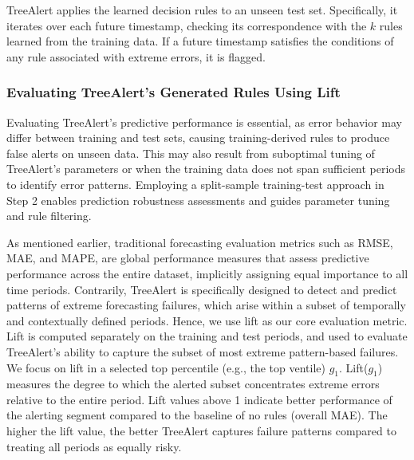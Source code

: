 \documentclass[12pt]{article}
\begin{document}
TreeAlert applies the learned decision rules to an unseen test set. Specifically, it iterates over each future timestamp, checking its correspondence with the $k$ rules learned from the training data. If a future timestamp satisfies the conditions of any rule associated with extreme errors, it is flagged.

\subsubsection{Evaluating TreeAlert’s Generated Rules Using Lift}
\label{Sup-A}

Evaluating TreeAlert's predictive performance is essential, as error behavior may differ between training and test sets, causing training-derived rules to produce false alerts on unseen data. This may also result from suboptimal tuning of TreeAlert’s parameters or when the training data does not span sufficient periods to identify error patterns. Employing a split-sample training-test approach in Step 2 enables prediction robustness assessments and guides parameter tuning and rule filtering. 

As mentioned earlier, traditional forecasting evaluation metrics such as RMSE, MAE, and MAPE, are global performance measures that assess predictive performance across the entire dataset, implicitly assigning equal importance to all time periods. Contrarily, TreeAlert is specifically designed to detect and predict patterns of extreme forecasting failures, which  arise within a subset of temporally and contextually defined periods. Hence, we use lift as our core evaluation metric. Lift is computed separately on the training and test periods, and used to evaluate TreeAlert's ability to capture the subset of most extreme pattern-based failures. We focus on lift in a selected top percentile (e.g., the top ventile) $g_1$. Lift($g_1$) measures the degree to which the alerted subset concentrates extreme errors relative to the entire period. Lift values above 1 indicate better performance of the alerting segment compared to the baseline of no rules (overall MAE). The higher the lift value, the better TreeAlert captures failure patterns compared to treating all periods as equally risky. %
\end{document}
